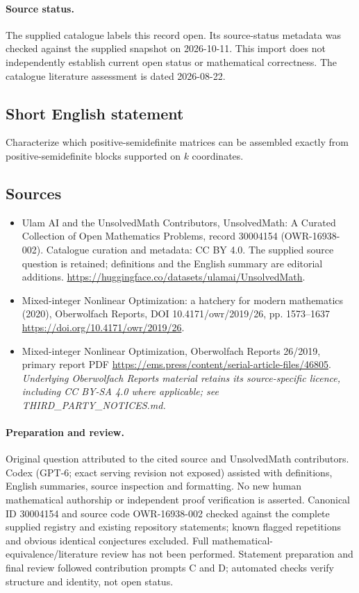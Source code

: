 \documentclass[11pt]{article}
\begin{document}
\paragraph{Source status.}
The supplied catalogue labels this record open. Its source-status metadata was checked against the supplied snapshot on 2026-10-11. This import does not independently establish current open status or mathematical correctness. The catalogue literature assessment is dated 2026-08-22.
\subsection{Short English statement}
Characterize which positive-semidefinite matrices can be assembled exactly from positive-semidefinite blocks supported on $k$ coordinates.
\subsection{Sources}
\begin{itemize}
\item[S1] Ulam AI and the UnsolvedMath Contributors, UnsolvedMath: A Curated Collection of Open Mathematics Problems, record 30004154 (OWR-16938-002). Catalogue curation and metadata: CC BY 4.0. The supplied source question is retained; definitions and the English summary are editorial additions.
\url{https://huggingface.co/datasets/ulamai/UnsolvedMath}.
\item[S2] Mixed-integer Nonlinear Optimization: a hatchery for modern mathematics (2020), Oberwolfach Reports, DOI 10.4171/owr/2019/26, pp. 1573--1637
\url{https://doi.org/10.4171/owr/2019/26}.
\item[S3] Mixed-integer Nonlinear Optimization, Oberwolfach Reports 26/2019, primary report PDF
\url{https://ems.press/content/serial-article-files/46805}.
\textit{Underlying Oberwolfach Reports material retains its source-specific licence, including CC BY-SA 4.0 where applicable; see THIRD\_PARTY\_NOTICES.md.}
\end{itemize}
\paragraph{Preparation and review.}
Original question attributed to the cited source and UnsolvedMath contributors. Codex (GPT-6; exact serving revision not exposed) assisted with definitions, English summaries, source inspection and formatting. No new human mathematical authorship or independent proof verification is asserted. Canonical ID 30004154 and source code OWR-16938-002 checked against the complete supplied registry and existing repository statements; known flagged repetitions and obvious identical conjectures excluded. Full mathematical-equivalence/literature review has not been performed. Statement preparation and final review followed contribution prompts C and D; automated checks verify structure and identity, not open status.
\label{end:30004154}
\end{document}
